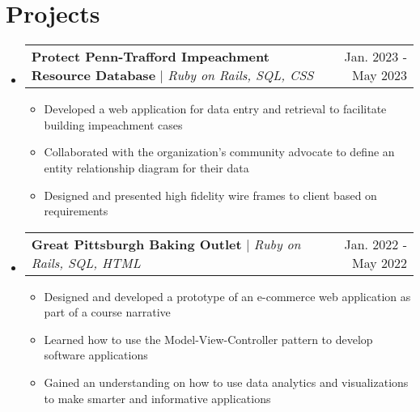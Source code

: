 \documentclass[letterpaper,11pt]{article}
\makeatletter
\newcommand{\resumeItem}[1]{
  \item\small{
    {#1 \vspace{-2pt}}
  }
}
\newcommand{\resumeProjectHeading}[2]{
    \item
    \begin{tabular*}{0.97\textwidth}{l@{\extracolsep{\fill}}r}
      \small#1 & #2 \\
    \end{tabular*}\vspace{-7pt}
}
\newcommand{\resumeSubHeadingListStart}{\begin{itemize}[leftmargin=0.15in, label={}]}
\newcommand{\resumeSubHeadingListEnd}{\end{itemize}}
\newcommand{\resumeItemListStart}{\begin{itemize}}
\newcommand{\resumeItemListEnd}{\end{itemize}\vspace{-5pt}}
\makeatother
\begin{document}
\section{Projects}
    \resumeSubHeadingListStart
        \resumeProjectHeading
        {\textbf{Protect Penn-Trafford Impeachment Resource Database} $|$ \emph{Ruby on Rails, SQL, CSS}}{Jan. 2023 - May 2023}
            \resumeItemListStart
                \resumeItem{Developed a web application for data entry and retrieval to facilitate building impeachment cases}
                \resumeItem{Collaborated with the organization's community advocate to define an entity relationship diagram for their data}
                \resumeItem{Designed and presented high fidelity wire frames to client based on requirements}
            \resumeItemListEnd
        \resumeProjectHeading
        {\textbf{Great Pittsburgh Baking Outlet} $|$ \emph{Ruby on Rails, SQL, HTML}}{Jan. 2022 - May 2022}
            \resumeItemListStart
                \resumeItem{Designed and developed a prototype of an e-commerce web application as part of a course narrative}
                \resumeItem{Learned how to use the Model-View-Controller pattern to develop software applications}
                \resumeItem{Gained an understanding on how to use data analytics and visualizations to make smarter and informative applications}
            \resumeItemListEnd
    \resumeSubHeadingListEnd

\end{document}
